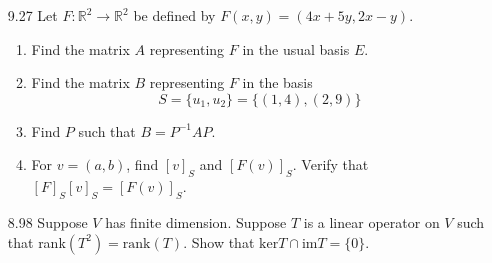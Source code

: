 \documentclass[12pt]{article}
\theoremstyle{definition}
\theoremstyle{plain}
\begin{document}
\begin{enumerate}
\item[9.27] Let $F:\mathbb{R}^2\rightarrow\mathbb{R}^2$ be defined by $F(x,y)=(4x+5y,2x-y)$.
	\begin{enumerate}
	\item Find the matrix $A$ representing $F$ in the usual basis $E$.
	\item Find the matrix $B$ representing $F$ in the basis
		\[ S=\{u_1,u_2\}=\{(1,4),(2,9)\} \]
	\item Find $P$ such that $B=P^{-1}AP$.
	\item For $v=(a,b)$, find $[v]_S$ and $[F(v)]_S$. Verify that $[F]_S[v]_S=[F(v)]_S$.
	\end{enumerate}
	
\item[8.98] Suppose $V$ has finite dimension. Suppose $T$ is a linear operator on $V$ such that rank$(T^2)=\mathrm{rank}(T)$. Show that $\mathrm{ker}T \cap \mathrm{im}T = \{0\}$.
	
	
	
	
	
	
	
	
	
	
\end{enumerate}
\end{document}
